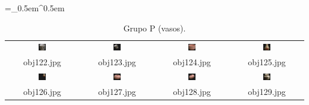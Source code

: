 \begin{table}[H]
  \centering
  \caption{Grupo P (vasos).}
  \tabulinesep =_0.5em^0.5em
  \everyrow{\tabucline[0.4pt]-}
  \begin{tabu}{|cccc|}
    \includegraphics[width=0.1\textwidth,height=0.1\textwidth]{imagens/coil_100/vasos/obj18__0.png} &
    \includegraphics[width=0.1\textwidth,height=0.1\textwidth]{imagens/coil_100/vasos/obj18__0_1.png} &
    \includegraphics[width=0.1\textwidth,height=0.1\textwidth]{imagens/coil_100/vasos/obj25__0.png} &
    \includegraphics[width=0.1\textwidth,height=0.1\textwidth]{imagens/coil_100/vasos/obj30__0.png}
    \\
    \scriptsize{obj122.jpg} & \scriptsize{obj123.jpg} & \scriptsize{obj124.jpg} &
    \scriptsize{obj125.jpg}
    \\
    \includegraphics[width=0.1\textwidth,height=0.1\textwidth]{imagens/coil_100/vasos/obj30__0_1.png} &
    \includegraphics[width=0.1\textwidth,height=0.1\textwidth]{imagens/coil_100/vasos/obj56__0.png} &
    \includegraphics[width=0.1\textwidth,height=0.1\textwidth]{imagens/coil_100/vasos/obj56__0_1.png} &
    \includegraphics[width=0.1\textwidth,height=0.1\textwidth]{imagens/coil_100/vasos/obj58__0.png}
    \\
    \scriptsize{obj126.jpg} & \scriptsize{obj127.jpg} & \scriptsize{obj128.jpg} &
    \scriptsize{obj129.jpg}
  \end{tabu}
\end{table}


